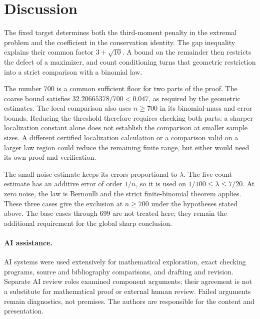 \section{Discussion}\label{ms:discussion}
The fixed target determines both the third-moment penalty in the
extremal problem and the coefficient in the conservation identity.
The gap inequality explains their common factor $3+\sqrt{10}$.
A bound on the remainder then restricts the defect of a maximizer,
and count conditioning turns that geometric restriction into a strict
comparison with a binomial law.

The number $700$ is a common sufficient floor for two parts of the
proof. The coarse bound satisfies $32.20665378/700<0.047$, as required
by the geometric estimates. The local comparison also uses $n\ge700$
in its binomial-mass and error bounds. Reducing the threshold therefore
requires checking both parts: a sharper localization constant alone
does not establish the comparison at smaller sample sizes. A different
certified localization calculation or a comparison valid on a larger
law region could reduce the remaining finite range, but either would
need its own proof and verification.

The small-noise estimate keeps its errors proportional to $\lambda$.
The five-count estimate has an additive error of order $1/n$, so it is
used on $1/100\le\lambda\le7/20$. At zero noise, the law is Bernoulli
and the strict finite-binomial theorem applies. These three cases give
the exclusion at $n\ge700$ under the hypotheses stated above.
The base cases through $699$ are not treated here; they remain the
additional requirement for the global sharp conclusion.

\paragraph{AI assistance.}
AI systems were used extensively for mathematical exploration, exact
checking programs, source and bibliography comparisons, and drafting
and revision. Separate AI review roles examined component arguments;
their agreement is not a substitute for mathematical proof or external
human review. Failed arguments remain diagnostics, not premises. The
authors are responsible for the content and presentation.

